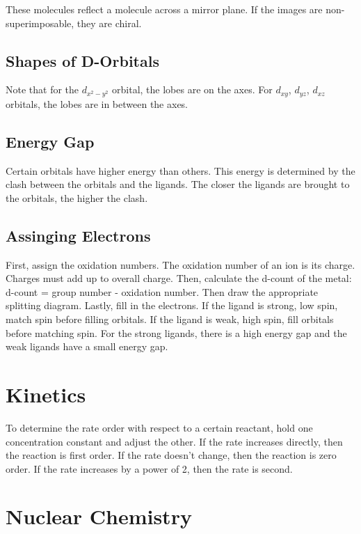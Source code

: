 \documentclass{article}
\begin{document}
These molecules reflect a molecule across a mirror plane. If the images are
non-superimposable, they are chiral.

\subsection{Shapes of D-Orbitals}

Note that for the $d_{x^{2}-y^{2}}$ orbital, the lobes are on the axes. For
$d_{xy}$, $d_{yz}$, $d_{xz}$ orbitals, the lobes are in between the axes.

\subsection{Energy Gap}

Certain orbitals have higher energy than others. This energy is determined by
the clash between the orbitals and the ligands. The closer the ligands are
brought to the orbitals, the higher the clash.

\subsection{Assinging Electrons}

First, assign the oxidation numbers. The oxidation number of an ion is its
charge. Charges must add up to overall charge. Then, calculate the d-count of
the metal: d-count = group number - oxidation number. Then draw the appropriate
splitting diagram. Lastly, fill in the electrons. If the ligand is strong, low
spin, match spin before filling orbitals. If the ligand is weak, high spin,
fill orbitals before matching spin. For the strong ligands, there is a high
energy gap and the weak ligands have a small energy gap.

\section{Kinetics}

To determine the rate order with respect to a certain reactant, hold one
concentration constant and adjust the other. If the rate increases directly,
then the reaction is first order. If the rate doesn't change, then the reaction
is zero order. If the rate increases by a power of 2, then the rate is second.

\section{Nuclear Chemistry}
\end{document}
